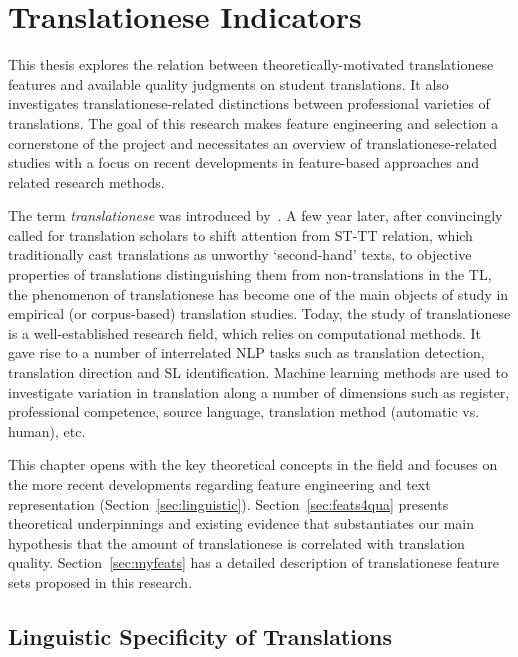 \chapter{\label{cha:indicators}Translationese Indicators}
This thesis explores the relation between theoretically-motivated translationese features and available quality judgments on student translations. It also investigates translationese-related distinctions between professional varieties of translations. 
The goal of this research makes feature engineering and selection a cornerstone of the project and necessitates an overview of translationese-related studies with a focus on recent developments in feature-based approaches and related research methods.

The term \textit{translationese} was introduced by~\citet{Gellerstam1986}. A few year later, after \citet{Baker1993} convincingly called for translation scholars to shift attention from \gls{ST}-\gls{TT} relation, which traditionally cast translations as unworthy `second-hand' texts, to objective properties of translations distinguishing them from non-translations in the TL, the phenomenon of translationese has become one of the main objects of study in empirical (or corpus-based) translation studies. 
Today, the study of translationese is a well-established research field, which relies on computational methods. It gave rise to a number of interrelated \gls{NLP} tasks such as translation detection, translation direction and SL identification. Machine learning methods are used to investigate variation in translation along a number of dimensions such as register, professional competence, source language, translation method (automatic vs. human), etc.

This chapter opens with the key theoretical concepts in the field and focuses on the more recent developments regarding feature engineering and text representation (Section~\ref{sec:linguistic}). Section~\ref{sec:feats4qua} presents theoretical underpinnings and existing evidence that substantiates our main hypothesis that the amount of translationese is correlated with translation quality. Section~\ref{sec:myfeats} has a detailed description of translationese feature sets proposed in this research.  

\section{\label{sec:linguistic}Linguistic Specificity of Translations}
